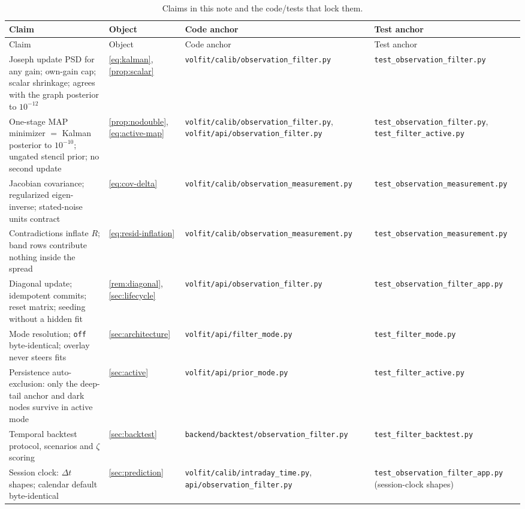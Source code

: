 \documentclass[11pt]{article}
\begin{document}
\begingroup
\small
\setlength{\tabcolsep}{3pt}
\begin{longtable}{@{}p{}p{}p{}p{}@{}}
\caption{Claims in this note and the code/tests that lock them.}\\
\toprule Claim & Object & Code anchor & Test anchor\\ \midrule
\endfirsthead
\toprule Claim & Object & Code anchor & Test anchor\\ \midrule
\endhead
Joseph update PSD for any gain; own-gain cap; scalar shrinkage; agrees with
the graph posterior to $10^{-12}$ &
\cref{eq:kalman}, \cref{prop:scalar} &
\nolinkurl{volfit/calib/observation_filter.py} &
\nolinkurl{test_observation_filter.py}\\
One-stage MAP minimizer $=$ Kalman posterior to $10^{-10}$; ungated stencil
prior; no second update &
\cref{prop:nodouble}, \cref{eq:active-map} &
\nolinkurl{volfit/calib/observation_filter.py},
\nolinkurl{volfit/api/observation_filter.py} &
\nolinkurl{test_observation_filter.py},
\nolinkurl{test_filter_active.py}\\
Jacobian covariance; regularized eigen-inverse; stated-noise units contract &
\cref{eq:cov-delta} &
\nolinkurl{volfit/calib/observation_measurement.py} &
\nolinkurl{test_observation_measurement.py}\\
Contradictions inflate $R$; band rows contribute nothing inside the spread &
\cref{eq:resid-inflation} &
\nolinkurl{volfit/calib/observation_measurement.py} &
\nolinkurl{test_observation_measurement.py}\\
Diagonal update; idempotent commits; reset matrix; seeding without a hidden
fit &
\cref{rem:diagonal}, \cref{sec:lifecycle} &
\nolinkurl{volfit/api/observation_filter.py} &
\nolinkurl{test_observation_filter_app.py}\\
Mode resolution; \texttt{off} byte-identical; overlay never steers fits &
\cref{sec:architecture} &
\nolinkurl{volfit/api/filter_mode.py} &
\nolinkurl{test_filter_mode.py}\\
Persistence auto-exclusion: only the deep-tail anchor and dark nodes survive
in active mode &
\cref{sec:active} &
\nolinkurl{volfit/api/prior_mode.py} &
\nolinkurl{test_filter_active.py}\\
Temporal backtest protocol, scenarios and $\zeta$ scoring &
\cref{sec:backtest} &
\nolinkurl{backend/backtest/observation_filter.py} &
\nolinkurl{test_filter_backtest.py}\\
Session clock: $\Delta t$ shapes; calendar default byte-identical &
\cref{sec:prediction} &
\nolinkurl{volfit/calib/intraday_time.py},
\nolinkurl{api/observation_filter.py} &
\nolinkurl{test_observation_filter_app.py} (session-clock shapes)\\
\bottomrule
\end{longtable}
\endgroup
\end{document}
